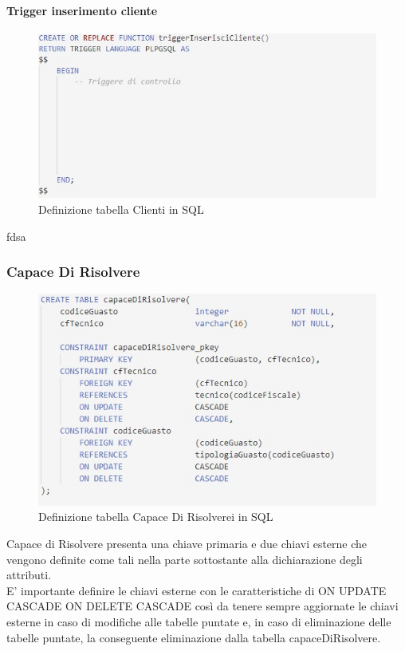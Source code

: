 \documentclass[legalpaper]{article}
\begin{document}
		\paragraph{Trigger inserimento cliente}
			\begin{figure}[h]
				\centering
				\includegraphics[width=0.9\linewidth]{Immagini SQL/triggerInserimentoCliente}
				\caption{Definizione tabella Clienti in SQL}
				\label{clientesql}
			\end{figure}
		fdsa\\

	\subsubsection{Capace Di Risolvere}
		\begin{figure}[h]
			\centering
			\includegraphics[width=0.9\linewidth]{Immagini SQL/capaceDiRisolvere}
			\caption{Definizione tabella Capace Di Risolverei in SQL}
			\label{CapaceDiRisolveresql}
		\end{figure}
		Capace di Risolvere presenta una chiave primaria e due chiavi esterne che 
		vengono definite come tali nella parte sottostante alla 	dichiarazione degli attributi. \\
		E' importante definire le chiavi esterne con le caratteristiche di ON UPDATE CASCADE ON DELETE CASCADE
		così da tenere sempre aggiornate le chiavi esterne in caso di modifiche alle tabelle puntate e, in caso di eliminazione delle tabelle 				puntate, la conseguente eliminazione dalla tabella capaceDiRisolvere.
\end{document}
